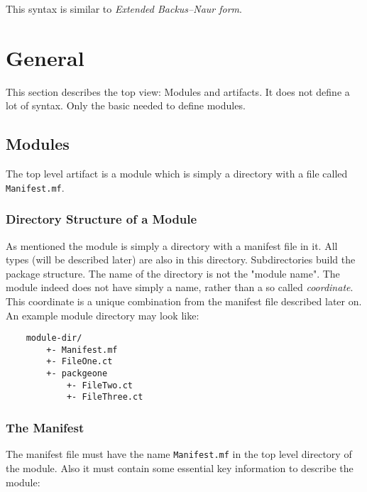 \documentclass[a4paper,12pt]{report}
\begin{document}
This syntax is similar to \textit{Extended Backus–Naur form}\cite{ebnf-wiki}.

\chapter{General}

This section describes the top view: Modules and artifacts. It does not define a lot of syntax. Only the basic needed to define modules.

\section{Modules}

The top level artifact is a module which is simply a directory with a file called \verb|Manifest.mf|.

\subsection{Directory Structure of a Module}

As mentioned the module is simply a directory with a manifest file in it. All types (will be described later) are also in this directory. Subdirectories build the package structure. The name of the directory is not the "module name". The module indeed does not have simply a name, rather than a so called \textit{coordinate}. This coordinate is a unique combination from the manifest file described later on. An example module directory may look like:

\begin{verbatim}
    module-dir/
        +- Manifest.mf
        +- FileOne.ct
        +- packgeone
            +- FileTwo.ct
            +- FileThree.ct
\end{verbatim}

\subsection{The Manifest}

The manifest file must have the name \verb|Manifest.mf| in the top level directory of the module. Also it must contain some essential key information to describe the module:
\end{document}
